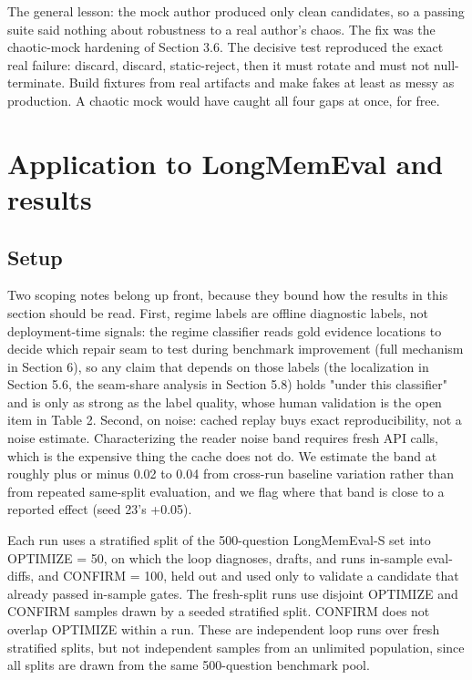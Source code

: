 The general lesson: the mock author produced only clean candidates, so a passing suite said nothing about robustness to a real author's chaos. The fix was the chaotic-mock hardening of Section 3.6. The decisive test reproduced the exact real failure: discard, discard, static-reject, then it must rotate and must not null-terminate. Build fixtures from real artifacts and make fakes at least as messy as production. A chaotic mock would have caught all four gaps at once, for free.


\section{Application to LongMemEval and results}

\subsection{Setup}

Two scoping notes belong up front, because they bound how the results in this section should be read. First, regime labels are offline diagnostic labels, not deployment-time signals: the regime classifier reads gold evidence locations to decide which repair seam to test during benchmark improvement (full mechanism in Section 6), so any claim that depends on those labels (the localization in Section 5.6, the seam-share analysis in Section 5.8) holds "under this classifier" and is only as strong as the label quality, whose human validation is the open item in Table 2. Second, on noise: cached replay buys exact reproducibility, not a noise estimate. Characterizing the reader noise band requires fresh API calls, which is the expensive thing the cache does not do. We estimate the band at roughly plus or minus 0.02 to 0.04 from cross-run baseline variation rather than from repeated same-split evaluation, and we flag where that band is close to a reported effect (seed 23's +0.05).

Each run uses a stratified split of the 500-question LongMemEval-S set into OPTIMIZE = 50, on which the loop diagnoses, drafts, and runs in-sample eval-diffs, and CONFIRM = 100, held out and used only to validate a candidate that already passed in-sample gates. The fresh-split runs use disjoint OPTIMIZE and CONFIRM samples drawn by a seeded stratified split. CONFIRM does not overlap OPTIMIZE within a run. These are independent loop runs over fresh stratified splits, but not independent samples from an unlimited population, since all splits are drawn from the same 500-question benchmark pool.

